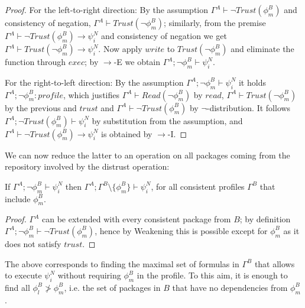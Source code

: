 \documentclass[]{llncs}
\begin{document}
\begin{proof}
	For the left-to-right direction: By the assumption $\Gamma^{A}\vdash \neg Trust(\phi_{m}^{B})$ and consistency of negation, $\Gamma^{A}\vdash Trust(\neg \phi_{m}^{B})$; similarly, from the premise $\Gamma^{A}\vdash \neg Trust(\phi_{m}^{B})\rightarrow \psi_{i}^{N}$ and consistency of negation we get $\Gamma^{A}\vdash Trust( \neg\phi_{m}^{B})\rightarrow \psi_{i}^{N}$. Now apply $write$ to $Trust( \neg\phi_{m}^{B})$ and eliminate the function through $exec$; by $\rightarrow$-E we obtain $\Gamma^{A}; \neg \phi_{m}^{B}\vdash \psi_{i}^{N}$.

	For the right-to-left direction: By the assumption $\Gamma^{A}; \neg \phi_{m}^{B}\vdash \psi_{i}^{N}$ it holds $\Gamma^{A}; \neg \phi^{B}_{m}: profile$, which justifies $\Gamma^{A}\vdash Read(\neg \phi^{B}_{m})$ by $read$, $\Gamma^{A}\vdash Trust(\neg \phi^{B}_{m})$ by the previous and $trust$ and $\Gamma^{A}\vdash \neg Trust( \phi^{B}_{m})$ by $\neg$-distribution. It follows $\Gamma^{A}; \neg Trust( \phi^{B}_{m})\vdash \psi_{i}^{N}$ by substitution from the assumption, and $\Gamma^{A}\vdash \neg Trust(\phi_{m}^{B})\rightarrow \psi_{i}^{N}$ is obtained by $\rightarrow$-I.
\end{proof}


We can now reduce the latter to an operation on all packages coming from the repository involved by the distrust operation:


\begin{lemma}\label{th:setminus}
	If $\Gamma^{A}; \neg \phi_{m}^{B}\vdash \psi_{i}^{N}$ then $\Gamma^{A}; \Gamma^{B}\setminus \{\phi_{m}^{B}\}\vdash \psi_{i}^{N}$, for all consistent profiles $\Gamma^{B}$ that include $\phi_{m}^{B}$.
\end{lemma}

\begin{proof}

$\Gamma^{A}$ can be extended with every consistent package from $B$; by definition $\Gamma^{A}; \neg \phi_{m}^{B}\vdash \neg Trust(\phi^{B}_{m})$, hence by Weakening this is possible except for $\phi^{B}_{m}$ as it does not satisfy $trust$.
\end{proof}

The above corresponds to finding the maximal set of formulas in $\Gamma^{B}$ that allows to execute $\psi_{i}^{N}$ without requiring $\phi_{m}^{B}$ in the profile. To this aim, it is enough to find all $\phi_{l}^{B}\ngtr\phi_{m}^{B}$, i.e. the set of packages in $B$ that have no dependencies from $\phi_{m}^{B}$.
\end{document}
